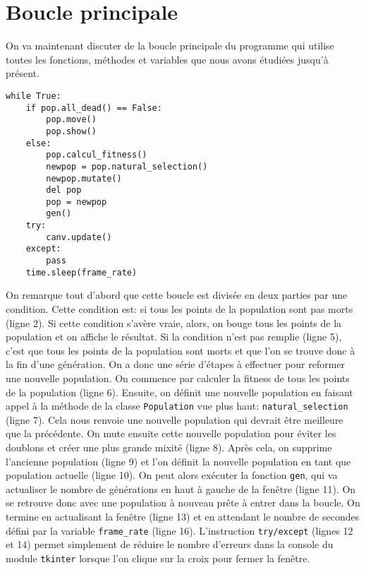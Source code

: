 \documentclass[12pt, a4paper, openany]{book}
\begin{document}
\section{Boucle principale}
On va maintenant discuter de la boucle principale du programme qui utilise toutes les fonctions, méthodes et variables que nous avons étudiées jusqu'à présent.
\begin{verbatim}
while True:
	if pop.all_dead() == False:
		pop.move()
		pop.show()
	else:
		pop.calcul_fitness()
		newpop = pop.natural_selection()
		newpop.mutate()
		del pop
		pop = newpop
		gen()
	try:
		canv.update()
	except:
		pass
	time.sleep(frame_rate)
\end{verbatim}
On remarque tout d'abord que cette boucle est divisée en deux parties par une condition. Cette condition est: si tous les points de la population sont pas \og morts\fg{} (ligne 2). Si cette condition s'avère vraie, alors, on bouge tous les points de la population et on affiche le résultat. Si la condition n'est pas remplie (ligne 5), c'est que tous les points de la population sont \og morts\fg{} et que l'on se trouve donc à la fin d'une génération. On a donc une série d'étapes à effectuer pour reformer une nouvelle population. On commence par calculer la fitness de tous les points de la population (ligne 6). Ensuite, on définit une nouvelle population en faisant appel à la méthode de la classe \verb'Population' vue plus haut: \verb'natural_selection' (ligne 7). Cela nous renvoie une nouvelle population qui devrait être meilleure que la précédente. On mute ensuite cette nouvelle population pour éviter les doublons et créer une plus grande mixité (ligne 8). Après cela, on supprime l'ancienne population (ligne 9) et l'on définit la nouvelle population en tant que population actuelle (ligne 10). On peut alors exécuter la fonction \verb'gen', qui va actualiser le nombre de générations en haut à gauche de la fenêtre (ligne 11). On se retrouve donc avec une population à nouveau prête à entrer dans la boucle. On termine en actualisant la fenêtre (ligne 13) et en attendant le nombre de secondes défini par la variable \verb'frame_rate' (ligne 16). L'instruction \verb'try/except' (lignes 12 et 14) permet simplement de réduire le nombre d'erreurs dans la console du module \verb'tkinter' lorsque l'on clique sur la croix pour fermer la fenêtre.
\end{document}
